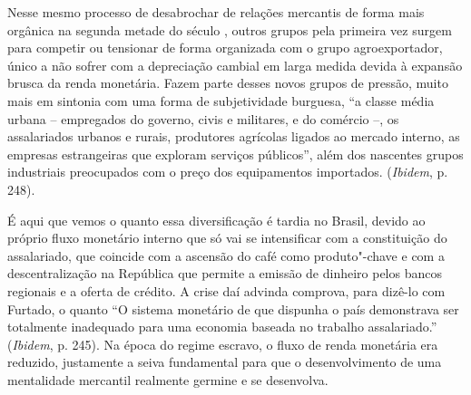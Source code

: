 {Nesse mesmo processo de desabrochar de relações mercantis de forma mais
orgânica na segunda metade do século , outros grupos pela primeira
vez surgem para competir ou tensionar de forma organizada com o grupo
agroexportador, único a não sofrer com a depreciação cambial em larga
medida devida à expansão brusca da renda monetária. Fazem parte desses
novos grupos de pressão, muito mais em sintonia com uma forma de
subjetividade burguesa, ``a classe média urbana -- empregados do
governo, civis e militares, e do comércio --, os assalariados urbanos e
rurais, produtores agrícolas ligados ao mercado interno, as empresas
estrangeiras que exploram serviços públicos'', além dos nascentes grupos
industriais preocupados com o preço dos equipamentos importados.
(\emph{Ibidem}, p. 248).

É aqui que vemos o quanto essa diversificação é tardia no Brasil, devido
ao próprio fluxo monetário interno que só vai se intensificar com a
constituição do assalariado, que coincide com a ascensão do café como
produto"-chave e com a descentralização na República que permite a
emissão de dinheiro pelos bancos regionais e a oferta de crédito. A
crise daí advinda comprova, para dizê-lo com Furtado, o quanto ``O
sistema monetário de que dispunha o país demonstrava ser totalmente
inadequado para uma economia baseada no trabalho assalariado.''
(\emph{Ibidem}, p. 245). Na época do regime escravo, o fluxo de renda
monetária era reduzido, justamente a seiva fundamental para que o desenvolvimento
de uma mentalidade mercantil realmente germine e se desenvolva.

}

